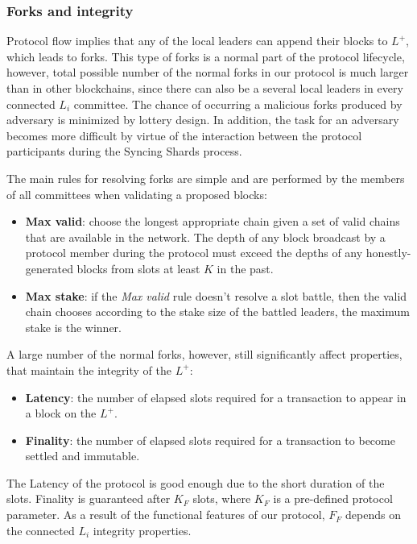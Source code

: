 \subsubsection{Forks and integrity}\label{subsec:resolving-forks}

Protocol flow implies that any of the local leaders can append their blocks to $L^+$, which leads to forks.
This type of forks is a normal part of the protocol lifecycle, however, total possible number of the normal forks in our protocol is much larger than in other blockchains, since there can also be a several local leaders in every connected $L_i$ committee.
The chance of occurring a malicious forks produced by adversary is minimized by lottery design.
In addition, the task for an adversary becomes more difficult by virtue of the interaction between the protocol participants during the Syncing Shards process.

The main rules for resolving forks are simple and are performed by the members of all committees when validating a proposed blocks:
\begin{itemize}
    \item \textbf{Max valid}: choose the longest appropriate chain given a set of valid chains that are available in the network.
    The depth of any block broadcast by a protocol member during the protocol must exceed the depths of any honestly-generated blocks from slots at least $K$ in the past.
    \item \textbf{Max stake}: if the \emph{Max valid} rule doesn't resolve a slot battle, then the valid chain chooses according to the stake size of the battled leaders, the maximum stake is the winner.
\end{itemize}

A large number of the normal forks, however, still significantly affect properties, that maintain the integrity of the $L^+$:
\begin{itemize}
    \item \textbf{Latency}: the number of elapsed slots required for a transaction to appear in a block on the $L^+$.
    \item \textbf{Finality}: the number of elapsed slots required for a transaction to become settled and immutable.
\end{itemize}
The Latency of the protocol is good enough due to the short duration of the slots.
Finality is guaranteed after $K_F$ slots, where $K_F$ is a pre-defined protocol parameter.
As a result of the functional features of our protocol, $F_F$ depends on the connected $L_i$ integrity properties.

